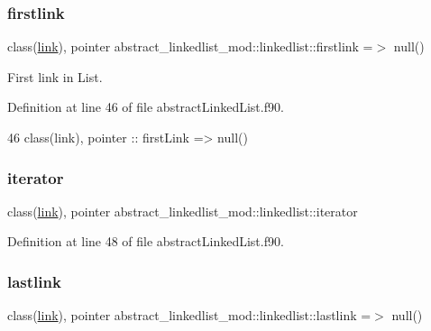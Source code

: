 \subsubsection{\texorpdfstring{firstlink}{firstlink}}
{\footnotesize\ttfamily class(\mbox{\hyperlink{structlink__mod_1_1link}{link}}), pointer abstract\+\_\+linkedlist\+\_\+mod\+::linkedlist\+::firstlink =$>$ null()\hspace{0.3cm}{\ttfamily [private]}}



First link in List. 



Definition at line 46 of file abstract\+Linked\+List.\+f90.


\begin{DoxyCode}
46         \textcolor{keywordtype}{class}(link), \textcolor{keywordtype}{pointer} :: firstLink => null()   
\end{DoxyCode}
\mbox{\label{structabstract__linkedlist__mod_1_1linkedlist_a96f2e50678291a2552e6c2cc54bc288d}} 
\subsubsection{\texorpdfstring{iterator}{iterator}}
{\footnotesize\ttfamily class(\mbox{\hyperlink{structlink__mod_1_1link}{link}}), pointer abstract\+\_\+linkedlist\+\_\+mod\+::linkedlist\+::iterator\hspace{0.3cm}{\ttfamily [private]}}



Definition at line 48 of file abstract\+Linked\+List.\+f90.

\mbox{\label{structabstract__linkedlist__mod_1_1linkedlist_af9747ed213a31f13aef74f95f014a503}} 
\subsubsection{\texorpdfstring{lastlink}{lastlink}}
{\footnotesize\ttfamily class(\mbox{\hyperlink{structlink__mod_1_1link}{link}}), pointer abstract\+\_\+linkedlist\+\_\+mod\+::linkedlist\+::lastlink =$>$ null()\hspace{0.3cm}{\ttfamily [private]}}



